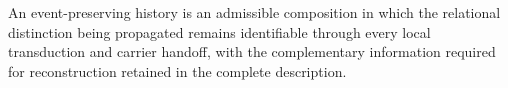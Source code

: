 \setcounter{theorem}{0}
\begin{definition}
An event-preserving history is an admissible composition in which the relational distinction being propagated remains identifiable through every local transduction and carrier handoff, with the complementary information required for reconstruction retained in the complete description.
\end{definition}
